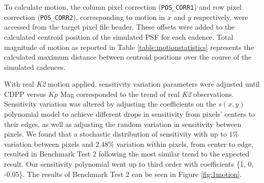 \documentclass[12pt,preprint]{aastex}
\begin{document}
To calculate motion, the column pixel correction (\texttt{POS\_CORR1}) and row pixel correction (\texttt{POS\_CORR2}), corresponding to motion in $x$ and $y$ respectively, were accessed from the target pixel file header. These offsets were added to the calculated centroid position of the simulated PSF for each cadence. Total magnitude of motion as reported in Table \ref{table:motionstatistics} represents the calculated maximum distance between centroid positions over the course of the simulated cadences.

With real \textit{K2} motion applied, sensitivity variation parameters were adjusted until CDPP versus $Kp$ Mag corresponded to the trend of real \textit{K2} observations. Sensitivity variation was altered by adjusting the coefficients on the $s(x,y)$ polynomial model to achieve different drops in sensitivity from pixels' centers to their edges, as well as adjusting the random variation in sensitivity between pixels. We found that a stochastic distribution of sensitivity with up to $1\%$ variation between pixels and $2.48\%$ variation within pixels, from center to edge, resulted in Benchmark Test 2 following the most similar trend to the expected result. Our sensitivity polynomial went up to third order with coefficients \{1, 0, -0.05\}. The results of Benchmark Test 2 can be seen in Figure \ref{fig:1motion}.
\end{document}
